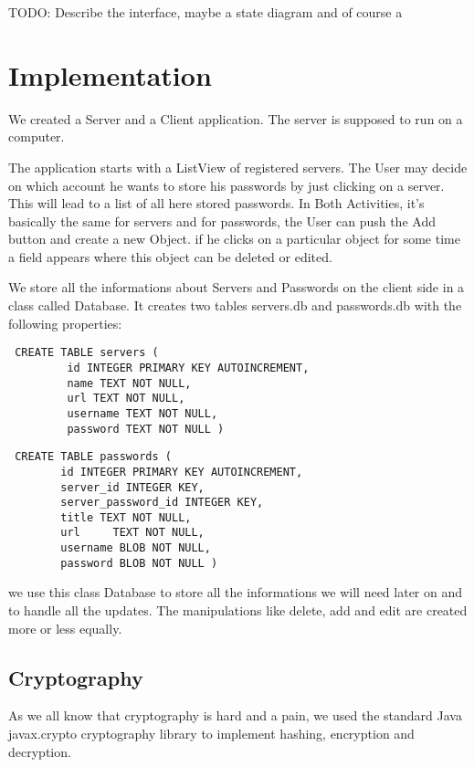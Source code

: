 \documentclass{report}
\begin{document}
TODO: Describe the interface, maybe a state diagram and of course a 








\section{Implementation}
We created a Server and a Client application. The server is supposed to run on a computer.

The application starts with a ListView of registered servers. The User may decide on which account he wants to store his passwords by just clicking on a server. This will lead to a list of all here  stored passwords. In Both Activities, it's basically the same for servers and for passwords, the User can push the Add button and create a new Object. if he clicks on a particular object for some time a field appears where this object can be deleted or edited. 

We store all the informations about Servers and Passwords on the client side in a class called Database. It creates two tables servers.db and passwords.db with the following properties:

\begin{lstlisting}     
 CREATE TABLE servers ( 
         id INTEGER PRIMARY KEY AUTOINCREMENT, 
         name TEXT NOT NULL, 
         url TEXT NOT NULL, 
         username TEXT NOT NULL, 
         password TEXT NOT NULL ) 
\end{lstlisting}
\begin{lstlisting} 	
 CREATE TABLE passwords (
        id INTEGER PRIMARY KEY AUTOINCREMENT,
        server_id INTEGER KEY,
        server_password_id INTEGER KEY, 
        title TEXT NOT NULL,
        url 	TEXT NOT NULL,
        username BLOB NOT NULL,
        password BLOB NOT NULL )
\end{lstlisting}

we use this class Database to store all the informations we will need later on and to handle all the updates. The manipulations like delete, add and edit are created more or less equally.

\subsection{Cryptography}
As we all know that cryptography is hard and a pain, we used the standard Java javax.crypto cryptography library to implement hashing, encryption and decryption.
\end{document}
